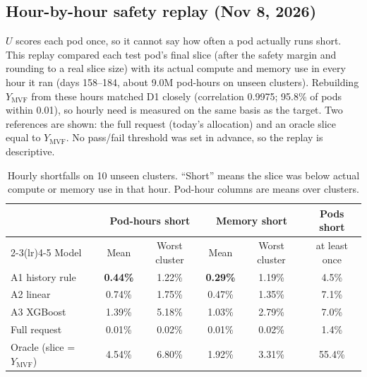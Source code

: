 \subsection{Hour-by-hour safety replay (Nov 8, 2026)}
\label{sec:hourly}

$U$ scores each pod once, so it cannot say how often a pod actually runs short. This replay compared each test pod's final slice (after the safety margin and rounding to a real slice size) with its actual compute and memory use in every hour it ran (days 158--184, about 9.0M pod-hours on unseen clusters). Rebuilding $Y_{\text{MVF}}$ from these hours matched D1 closely (correlation 0.9975; 95.8\% of pods within 0.01), so hourly need is measured on the same basis as the target. Two references are shown: the full request (today's allocation) and an oracle slice equal to $Y_{\text{MVF}}$. No pass/fail threshold was set in advance, so the replay is descriptive.

\begin{table}[H]
\centering\small
\caption{Hourly shortfalls on 10 unseen clusters. ``Short'' means the slice was below actual compute or memory use in that hour. Pod-hour columns are means over clusters.}
\label{tab:hourly}
\begin{tabular}{@{}lccccc@{}}
\toprule
& \multicolumn{2}{c}{Pod-hours short} & \multicolumn{2}{c}{Memory short} & Pods short \\
\cmidrule(lr){2-3}\cmidrule(lr){4-5}
Model & Mean & Worst cluster & Mean & Worst cluster & at least once \\
\midrule
A1 history rule & \textbf{0.44\%} & 1.22\% & \textbf{0.29\%} & 1.19\% & 4.5\% \\
A2 linear & 0.74\% & 1.75\% & 0.47\% & 1.35\% & 7.1\% \\
A3 XGBoost & 1.39\% & 5.18\% & 1.03\% & 2.79\% & 7.0\% \\
Full request & 0.01\% & 0.02\% & 0.01\% & 0.02\% & 1.4\% \\
Oracle (slice = $Y_{\text{MVF}}$) & 4.54\% & 6.80\% & 1.92\% & 3.31\% & 55.4\% \\
\bottomrule
\end{tabular}
\end{table}

